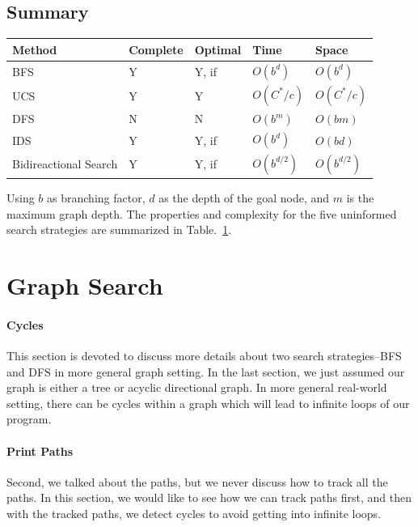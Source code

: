 \documentclass[main.tex]{subfiles}
\begin{document}
\subsection{Summary}
\begin{table}[!ht]
\begin{small}
\centering
\noindent{}
 \noindent \begin{tabular}{|p{}|p{}|p{}|p{}|p{}| }
  \hline
Method & Complete & Optimal & Time & Space   \\ \hline
BFS  & Y& Y, if & $O(b^d)$ & $O(b^d)$ \\\hline
UCS  &Y & Y & $O(C^{*}/c)$ & $O(C^{*}/c)$\\ \hline
DFS & N & N & $O(b^m)$ & $O(bm)$\\ \hline
IDS & Y & Y, if & $O(b^d)$ & $O(bd)$\\ \hline
Bidireactional Search & Y& Y, if& $O(b^{d/2})$ & $O(b^{d/2})$\\ \hline
\end{tabular}
  \label{tab:performance of searching strategy}
  \end{small}
\end{table}
Using $b$ as branching factor, $d$ as the depth of the goal node, and $m$  is the maximum graph depth. The properties and complexity for the five uninformed search strategies are summarized in Table.~\ref{tab:performance of searching strategy}.

 


 
\section{Graph Search}
\paragraph{Cycles}
This section is devoted to discuss more details about two search strategies--BFS and DFS in more general graph setting. In the last section, we just assumed our graph is either a tree or acyclic directional graph. In more general real-world setting, there can be cycles within a graph which will lead to infinite loops of our program. 
\paragraph{Print Paths} Second, we talked about the paths, but we never discuss how to track all the paths. In this section, we would like to see how we can track paths first, and then with the tracked paths, we detect cycles to avoid getting into infinite loops. 
\end{document}
